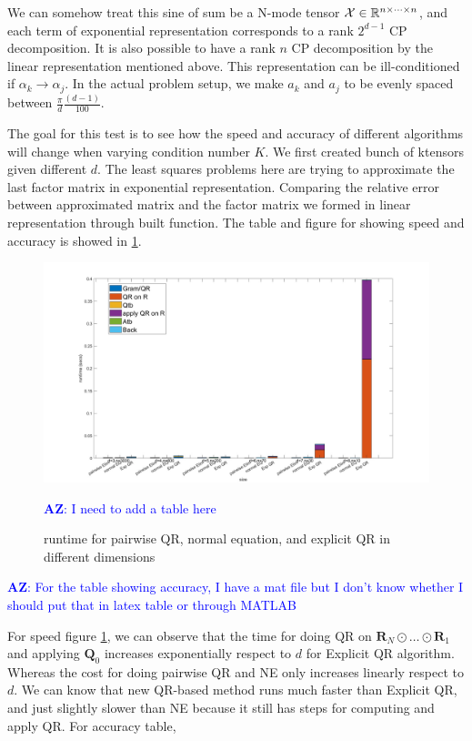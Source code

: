 \documentclass{article}
\newcommand{\mat}[1]{\mathbf{#1}}
\newcommand{\T}[2][]{#1{\mathbf{\cal{#2}}}} 						%
\newcommand{\AZ}[1]{\textcolor{blue}{\textbf{AZ}: #1}}
\begin{document}
We can somehow treat this sine of sum be a N-mode tensor $\T{X} \in \mathbb{R}^{n \times \dots \times n}$, and each term of exponential representation corresponds to a rank $2^{d-1}$ CP decomposition. 
It is also possible to have a rank $n$ CP decomposition by the linear representation mentioned above. 
This representation can be ill-conditioned if $\alpha_k \rightarrow \alpha_j$.
In the actual problem setup, we make $a_k$ and $a_j$ to be evenly spaced between $\frac{\pi}{d}\frac{(d-1)}{100}$. 

The goal for this test is to see how the speed and accuracy of different algorithms will change when varying condition number $K$.
We first created bunch of ktensors given different $d$. The least squares problems here are trying to approximate the last factor matrix in exponential representation. Comparing the relative error between approximated matrix and the factor matrix we formed in linear representation through built function. 
The table and figure for showing speed and accuracy is showed in \cref{fig:LS_problem}.

\begin{figure}[ht!]
  
  \begin{center}
    \includegraphics*[scale = 0.2]{6dim.jpg}
    \caption[Figure]{runtime for pairwise QR, normal equation, and explicit QR in different dimensions \label{fig:LS_problem}}
    \AZ{I need to add a table here}
  \end{center}
    
\end{figure}
\AZ{For the table showing accuracy, I have a mat file but I don't know whether I should put that in latex table or through MATLAB}

For speed figure \cref{fig:LS_problem}, we can observe that the time for doing QR on $\mat{R}_N \odot \dots \odot \mat{R}_1$ and applying $\mat{Q}_0$ increases exponentially respect to $d$ for Explicit QR algorithm.
Whereas the cost for doing pairwise QR and NE only increases linearly respect to $d$.
We can know that new QR-based method runs much faster than Explicit QR, and just slightly slower than NE because it still has steps for computing and apply QR.
For accuracy table, 
\end{document}
